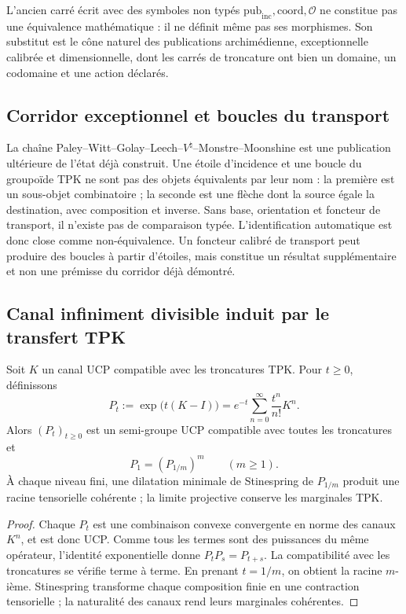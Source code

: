 L'ancien carré écrit avec des symboles non typés
\(\mathrm{pub}_{\mathrm{inc}},\mathrm{coord},\mathcal O\) ne constitue pas une
équivalence mathématique : il ne définit même pas ses morphismes. Son substitut est le
cône naturel des publications archimédienne, exceptionnelle calibrée et
dimensionnelle, dont les carrés de troncature ont bien un domaine, un codomaine et une
action déclarés.

\subsection{Corridor exceptionnel et boucles du transport}

La chaîne Paley--Witt--Golay--Leech--\(V^{\natural}\)--Monstre--Moonshine
est une publication ultérieure de l'état déjà construit. Une étoile
d'incidence et une boucle du groupoïde TPK ne sont pas des objets équivalents par leur
nom : la première est un sous-objet combinatoire ; la seconde est une flèche dont
la source égale la destination, avec composition et inverse. Sans base, orientation et foncteur
de transport, il n'existe pas de comparaison typée. L'identification
automatique est donc close comme non-équivalence. Un foncteur calibré de
transport peut produire des boucles à partir d'étoiles, mais constitue un
résultat supplémentaire et non une prémisse du corridor déjà démontré.

\subsection{Canal infiniment divisible induit par le transfert TPK}

\begin{theorem}
\label{thm:hmt-final-poissonizacion-ucp}
Soit \(K\) un canal UCP compatible avec les troncatures TPK\@. Pour \(t\ge0\),
définissons
\[
 P_t:=\exp\bigl(t(K-I)\bigr)
 =e^{-t}\sum_{n=0}^{\infty}\frac{t^n}{n!}K^n.
\]
Alors \((P_t)_{t\ge0}\) est un semi-groupe UCP compatible avec toutes les
troncatures et
\[
 P_1=(P_{1/m})^m
 \qquad(m\ge1).
\]
À chaque niveau fini, une dilatation minimale de Stinespring de \(P_{1/m}\)
produit une racine tensorielle cohérente ; la limite projective conserve les
marginales TPK.
\end{theorem}

\begin{proof}
Chaque \(P_t\) est une combinaison convexe convergente en norme des canaux
\(K^n\), et est donc UCP\@. Comme tous les termes sont des puissances du même
opérateur, l'identité exponentielle donne \(P_tP_s=P_{t+s}\). La compatibilité
avec les troncatures se vérifie terme à terme. En prenant \(t=1/m\), on
obtient la racine \(m\)-ième. Stinespring transforme chaque composition finie en
une contraction tensorielle ; la naturalité des canaux rend leurs
marginales cohérentes.
\end{proof}

